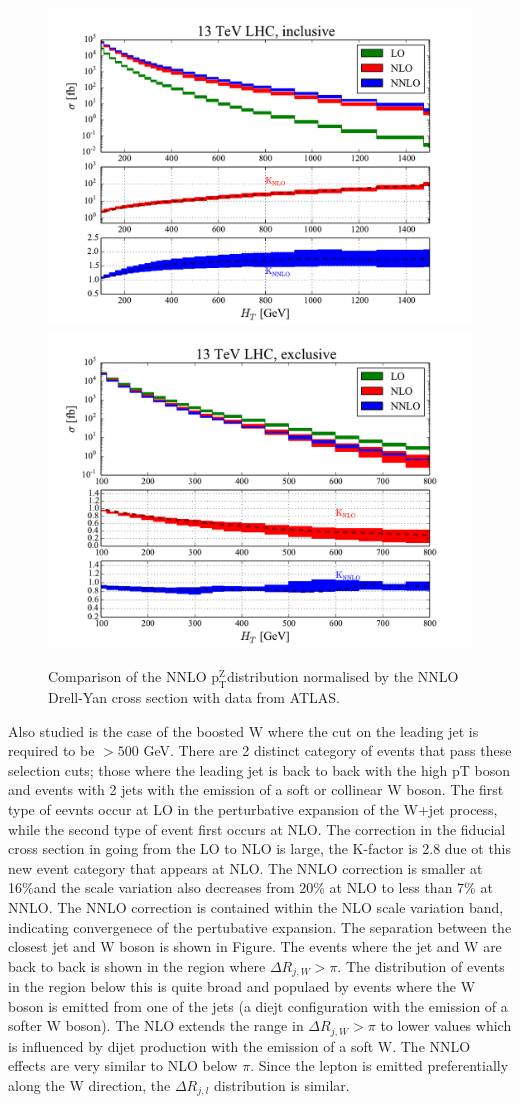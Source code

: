 \documentclass[a4paper,11pt,notoc]{article}
\newcommand{\ptZ}{\ensuremath{\mathrm{p_T^{Z}}}}
\begin{document}
\begin{figure}[t!]
\centering
\includegraphics[width=0.495\columnwidth]{HT_13TeV_incl.pdf} 
\includegraphics[width=0.495\columnwidth]{HT_13TeV_excl.pdf} 
\caption{Comparison of the NNLO \ptZ distribution normalised by the NNLO Drell-Yan cross section with data from ATLAS.}
\label{fig:ptNNLO}
\end{figure}   
Also studied is the case of the boosted W where the cut on the leading jet is required to be $> 500$ GeV. There are 2 distinct category of events that pass these selection cuts; those where the leading jet is back to back with the high pT boson and events with 2 jets with the emission of a soft or collinear W boson. The first type of eevnts occur at LO in the perturbative expansion of the W+jet process, while the second type of event first occurs at NLO. The correction in the fiducial cross section in going from the LO to NLO is large, the K-factor is 2.8 due ot this new event category that appears at NLO. The NNLO correction is smaller at 16\%and the scale variation also decreases from 20\% at NLO to less than 7\% at NNLO. The NNLO correction is contained within the NLO scale variation band, indicating convergenece of the pertubative expansion. 
The separation between the closest jet and W boson is shown in Figure. The events where the jet and W are back to back is shown in the region where $\Delta R_{j,W} > \pi$. The distribution of events in the region below this is quite broad and populaed by events where the W boson is emitted from one of the jets (a diejt configuration with the emission of a softer W boson). The NLO extends the range in $\Delta R_{j,W} > \pi$ to lower values which is influenced by dijet production with the emission of a soft W. The NNLO effects are very similar to NLO below $\pi$. Since the lepton is emitted preferentially along the W direction, the  $\Delta R_{j,l}$ distribution is similar. 
\end{document}
